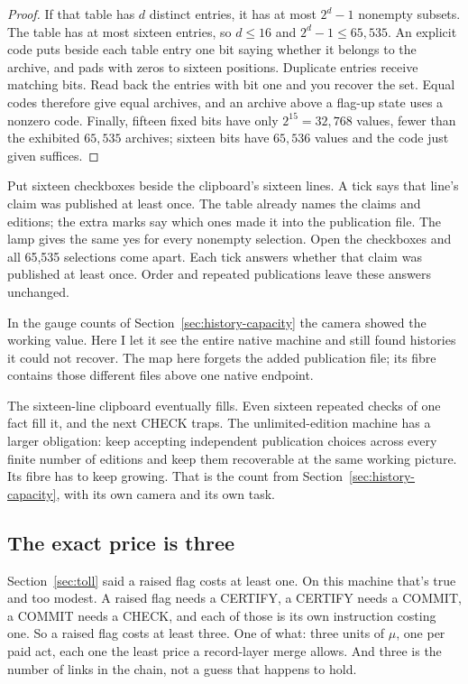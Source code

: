 \documentclass[11pt,twoside]{article}
\theoremstyle{thielethm}
\theoremstyle{thieledef}
\theoremstyle{thieledef}
\theoremstyle{thieledef}
\theoremstyle{thielethm}
\theoremstyle{thieleobs}
\theoremstyle{thielethm}
\begin{document}
\begin{proof}
If that table has $d$ distinct entries, it has at most $2^d-1$ nonempty subsets.
The table has at most sixteen entries, so $d\le16$ and $2^d-1\le65{,}535$.
An explicit code puts beside each table entry one bit saying whether it belongs to the
archive, and pads with zeros to sixteen positions. Duplicate entries receive matching
bits. Read back the entries with bit one and you recover the set. Equal codes therefore
give equal archives, and an archive above a flag-up state uses a nonzero code.
Finally, fifteen fixed bits have only $2^{15}=32{,}768$ values, fewer than the exhibited
$65{,}535$ archives; sixteen bits have $65{,}536$ values and the code just given suffices.
\end{proof}

Put sixteen checkboxes beside the clipboard's sixteen lines. A tick says that line's
claim was published at least once. The table already names the claims and editions;
the extra marks say which ones made it into the publication file. The lamp gives the
same yes for every nonempty selection. Open the checkboxes and all 65,535 selections
come apart.
Each tick answers whether that claim was published at least once. Order and repeated publications leave these answers unchanged.

In the gauge counts of Section~\ref{sec:history-capacity} the camera showed the working value. Here I let it see the entire native
machine and still found histories it could not recover. The map here forgets the added
publication file; its fibre contains those different files above one native endpoint.

The sixteen-line clipboard eventually fills. Even sixteen repeated checks of one fact
fill it, and the next CHECK traps. The unlimited-edition machine has a larger obligation:
keep accepting independent publication choices across every finite number of editions
and keep them recoverable at the same working picture. Its fibre has to keep growing.
That is the count from Section~\ref{sec:history-capacity}, with its own camera and its own task.

\subsection{The exact price is three}

Section~\ref{sec:toll} said a raised flag costs at least one. On this machine that's true and too modest. A
raised flag needs a CERTIFY, a CERTIFY needs a COMMIT, a COMMIT needs a CHECK, and each of
those is its own instruction costing one. So a raised flag costs at least three. One of what: three units of
$\mu$, one per paid act, each one the least price a record-layer merge allows. And three is the
number of links in the chain, not a guess that happens to hold.
\end{document}

